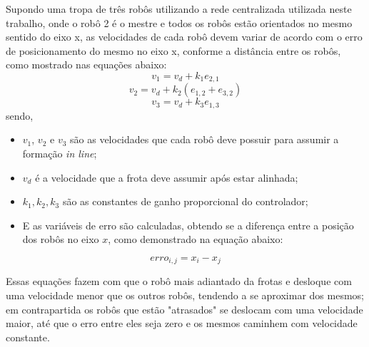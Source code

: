 Supondo uma tropa de três robôs utilizando a rede centralizada utilizada neste trabalho, onde o robô 2 é o mestre e todos os robôs estão orientados no mesmo sentido do eixo x, as velocidades de cada robô devem variar de acordo com o erro de posicionamento do mesmo no eixo x, conforme a distância entre os robôs, como mostrado nas  equações abaixo:
\begin{equation}
v_{1} = v_{d} + k_{1} e_{2,1}
\label{eq:vel1P1}
\end{equation}
\begin{equation}
v_{2} = v_{d} + k_{2} (e_{1,2} + e_{3,2})
\label{eq:vel2P1}
\end{equation}
\begin{equation}
v_{3} = v_{d} + k_{3} e_{1,3}
\label{eq:vel3P1}
\end{equation}
sendo,
\begin{itemize}
	\item $v_{1}$, $v_{2}$ e $v_{3}$ são as velocidades que cada robô deve possuir para assumir a formação \emph{in line};
	\item $v_{d}$ é a velocidade que a frota deve assumir após estar alinhada;
	\item $k_{1},k_{2},k_{3}$ são as constantes de ganho proporcional do controlador;
	\item E as variáveis de erro são calculadas, obtendo se a diferença entre a posição dos robôs no eixo $x$, como demonstrado na equação abaixo:	
\end{itemize}
\begin{equation}
erro_{i,j} = x_{i} - x_{j}
\label{eq:errp1}
\end{equation}

 Essas equações fazem com que o robô mais adiantado da frotas e desloque com uma velocidade menor que os outros robôs, tendendo a se aproximar dos mesmos; em contrapartida os robôs que estão "atrasados" se deslocam com uma velocidade maior, até que o erro entre eles seja zero e os mesmos caminhem com velocidade constante. 


